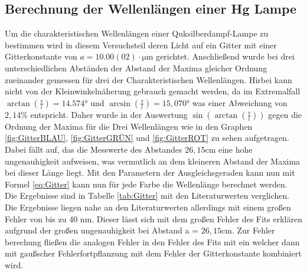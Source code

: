 \documentclass[11pt, a4paper]{article}
\begin{document}
    \subsection{Berechnung der Wellenlängen einer Hg Lampe}
    Um die charakteristischen Wellenlängen einer Quksilberdampf-Lampe zu bestimmen wird in diesem Versuchsteil deren Licht auf ein Gitter mit einer Gitterkonstante von $a=10.00(02)\cdot \si{\micro\metre}$ gerichtet.
    Anschließend wurde bei drei unterschiedlichen Abständen der Abstand der Maxima gleicher Ordnung zueinander gemessen für drei der Charakteristischen Wellenlängen. Hirbei kann nicht von der Kleinwinkelnäherung gebrauch gemacht werden, da im Extremalfall $\arctan(\frac{s}{l}) = 14.574°$ und $\arcsin(\frac{s}{l}) = 15,070°$
    was einer Abweichung von $2,14\percent$ entspricht. Daher wurde in der Auswertung $\sin(\arctan(\frac{s}{l}))$ gegen die Ordnung der Maxima für die Drei Wellenlängen wie in den Graphen \ref{fig:GitterBLAU}, \ref{fig:GitterGRÜN} und \ref{fig:GitterROT} zu sehen aufgetragen.
    Dabei fällt auf, das die Messwerte des Abstandes $26,15 \si{\centi\metre}$ eine hohe ungenauhigkeit aufweisen, was vermutlich an dem kleineren Abstand der Maxima bei dieser Länge liegt.
    Mit den Parametern der Ausgleichsgeraden kann nun mit Formel \ref{eq:Gitter} kann nun für jede Farbe die Wellenlänge berechnet werden. Die Ergebnisse sind in Tabelle \ref{tab:Gitter} mit den Literaturwerten verglichen. Die Ergebnisse liegen nahe an den Literaturwerten allerdings mit einem großen Fehler von bis zu 40 nm.
    Dieser lässt sich mit dem großen Fehler des Fits erklären aufgrund der großen ungenauhigkeit bei Abstand a =  $26,15 \si{\centi\metre}$. Zur Fehler berechung fließen die analogen Fehler in den Fehler des Fits mit ein welcher dann mit gaußscher Fehlerfortpflanzung mit dem Fehler der Gitterkonstante kombiniert wird.
\end{document}
